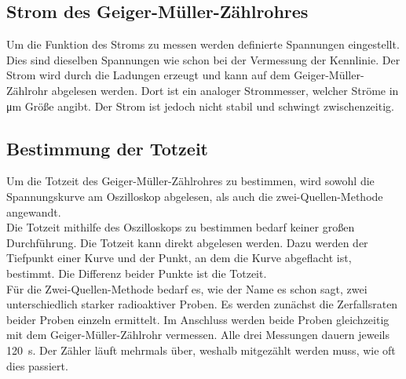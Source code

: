 \subsection{Strom des Geiger-Müller-Zählrohres}
Um die Funktion des Stroms zu messen werden definierte Spannungen eingestellt. Dies sind dieselben Spannungen wie schon bei der 
Vermessung der Kennlinie. Der Strom wird durch die Ladungen erzeugt und kann auf dem Geiger-Müller-Zählrohr abgelesen werden. Dort 
ist ein analoger Strommesser, welcher Ströme in \unit{\micro\meter} Größe angibt. Der Strom ist jedoch nicht stabil und schwingt 
zwischenzeitig.

\subsection{Bestimmung der Totzeit}
Um die Totzeit des Geiger-Müller-Zählrohres zu bestimmen, wird sowohl die Spannungskurve am Oszilloskop abgelesen, als auch 
die zwei-Quellen-Methode angewandt. \\
\noindent Die Totzeit mithilfe des Oszilloskops zu bestimmen bedarf keiner großen Durchführung. Die Totzeit kann direkt abgelesen werden. 
Dazu werden der Tiefpunkt einer Kurve und der Punkt, an dem die Kurve abgeflacht ist, bestimmt. Die Differenz beider Punkte ist die Totzeit. \\
\noindent Für die Zwei-Quellen-Methode bedarf es, wie der Name es schon sagt, zwei unterschiedlich starker radioaktiver Proben. Es werden 
zunächst die Zerfallsraten beider Proben einzeln ermittelt. Im Anschluss werden beide Proben gleichzeitig mit dem Geiger-Müller-Zählrohr 
vermessen. Alle drei Messungen dauern jeweils \qty{120}{\second}.
Der Zähler läuft mehrmals über, weshalb mitgezählt werden muss, wie oft dies passiert.


%

